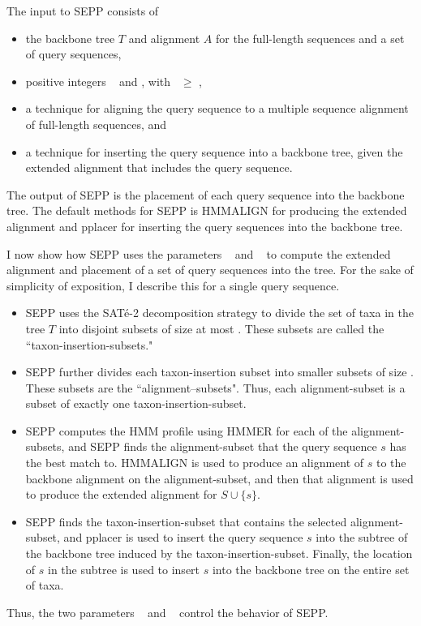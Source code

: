 The input to SEPP
consists of
\begin{itemize}
\item the backbone tree $T$ and alignment $A$
for the full-length sequences and 
a set of query sequences,
\item
positive integers
\ssa~ and \ssp, with \ssp~$\geq$ \ssa, 
\item a technique for aligning the query sequence
to a multiple sequence alignment of full-length sequences, and
\item
a technique for inserting the query sequence into
a backbone tree, given the extended alignment that
includes the query sequence.
\end{itemize}
The output of SEPP
is the placement of each query sequence into the backbone tree.  The
default methods for SEPP is HMMALIGN for producing the extended alignment
and pplacer for inserting the query sequences into the backbone tree.


I now show how SEPP uses the parameters \ssa~ and
\ssp~ to compute the extended alignment and placement of a
set of query sequences
into the tree.
For the sake of simplicity of exposition, I describe this for a single
query sequence.

\begin{itemize}
\item 
SEPP uses the SAT\'{e}-2 decomposition strategy 
to divide the set of taxa in the tree $T$
into disjoint subsets of size at most \ssp.
These subsets are called the ``taxon-insertion-subsets."
\item
SEPP further divides each taxon-insertion subset 
into smaller subsets of size \ssa.
These subsets are the ``alignment--subsets".
Thus, each  alignment-subset is a subset of 
exactly one taxon-insertion-subset.
\item SEPP computes the HMM profile using HMMER for each of the alignment-subsets,
and SEPP finds the alignment-subset that the query sequence $s$ has the best
match to.  HMMALIGN is used to produce an alignment of
$s$ to the backbone alignment on the alignment-subset,
and then that alignment is used to produce the extended alignment for
$S \cup \{s\}$. 
\item 
SEPP finds the taxon-insertion-subset that contains
the selected alignment-subset, and
pplacer is used to insert 
the query sequence $s$ into the 
subtree of the backbone tree induced by the taxon-insertion-subset.
Finally, the location of $s$ in the subtree is used to insert
$s$ into the backbone tree on the entire set of taxa.
\end{itemize}
Thus, the two  parameters \ssa~ and \ssp~ control the
behavior of SEPP.

